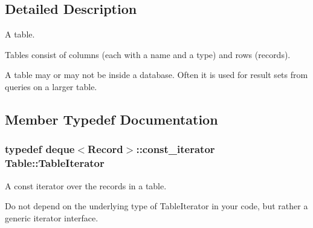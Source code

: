 \subsection{Detailed Description}
A table.

Tables consist of columns (each with a name and a type) and rows (records).

A table may or may not be inside a database. Often it is used for result sets from queries on a larger table. 

\subsection{Member Typedef Documentation}
\hypertarget{class_table_aa04536c6711fef7696862b4d94c077e9}{
\subsubsection[{Table\-Iterator}]{\setlength{\rightskip}{0pt plus 5cm}typedef deque$<${\bf Record}$>$\-::const\-\_\-iterator {\bf Table\-::\-Table\-Iterator}}}\label{class_table_aa04536c6711fef7696862b4d94c077e9}
A const iterator over the records in a table.

Do not depend on the underlying type of Table\-Iterator in your code, but rather a generic iterator interface. 

